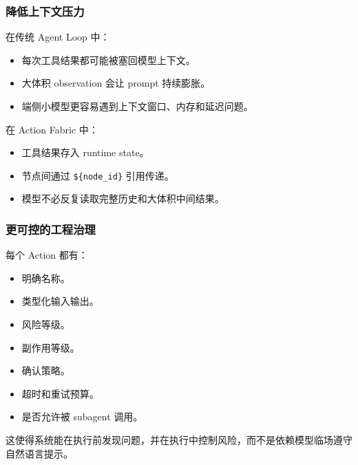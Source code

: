 \documentclass[aspectratio=169]{ctexbeamer}
\newcommand{\code}[1]{\texttt{#1}}
\begin{document}
\begin{frame}
  \frametitle{降低上下文压力}
  在传统 Agent Loop 中：
  \begin{itemize}
    \item 每次工具结果都可能被塞回模型上下文。
    \item 大体积 observation 会让 prompt 持续膨胀。
    \item 端侧小模型更容易遇到上下文窗口、内存和延迟问题。
  \end{itemize}

  \vspace{0.5em}
  在 Action Fabric 中：
  \begin{itemize}
    \item 工具结果存入 runtime state。
    \item 节点间通过 \code{\$\{node\_id\}} 引用传递。
    \item 模型不必反复读取完整历史和大体积中间结果。
  \end{itemize}
\end{frame}

\begin{frame}
  \frametitle{更可控的工程治理}
  每个 Action 都有：
  \begin{itemize}
    \item 明确名称。
    \item 类型化输入输出。
    \item 风险等级。
    \item 副作用等级。
    \item 确认策略。
    \item 超时和重试预算。
    \item 是否允许被 subagent 调用。
  \end{itemize}

  \vspace{0.5em}
  这使得系统能在执行前发现问题，并在执行中控制风险，而不是依赖模型临场遵守自然语言提示。
\end{frame}
\end{document}
